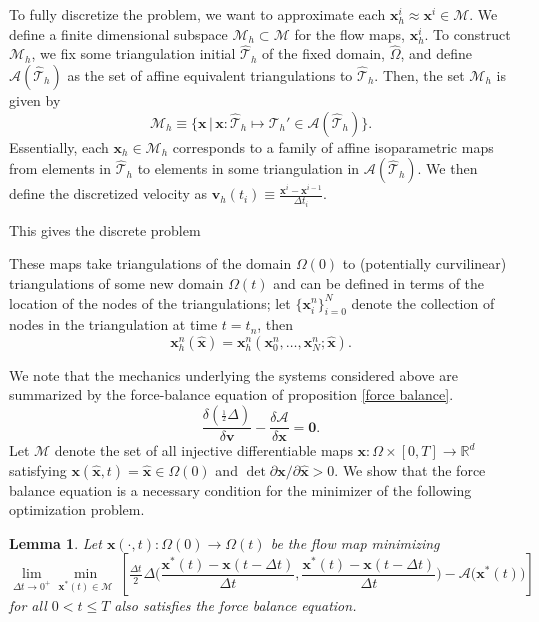 \documentclass[final,10pt]{article}
\newtheorem{lemma}{Lemma}
\begin{document}
To fully discretize the problem, we want to approximate each $\bm x^i_h \approx \bm x^i \in \mathcal M$.
We define a finite dimensional subspace $\mathcal{M}_h \subset \mathcal M$ for the flow maps, $\bm x_h^i$.
To construct $\mathcal M_h$, we fix some triangulation initial $\hat{\mathcal T}_h$ of the fixed domain, $\hat \Omega$,
and define $\mathcal A (\hat{\mathcal T}_h)$ as the set of affine equivalent triangulations to $\hat{\mathcal T}_h$.
Then, the set $\mathcal M_h$ is given by
\[
	\mathcal{M}_h \equiv \Big\{ \bm x \, \big| \, \bm x: \hat{\mathcal{T}}_h \mapsto \mathcal T_h' \in \mathcal A(\hat{\mathcal T}_h) \Big\}.
\]
Essentially, each $\bm x_h \in \mathcal M_h$ corresponds to a family of affine isoparametric maps from elements in $\hat{\mathcal T}_h$
to elements in some triangulation in $\mathcal A (\hat{\mathcal{T}}_h)$.
We then define the discretized velocity as $\bm v_h(t_i) \equiv \frac{\bm x^i - \bm x^{i-1}}{\Delta t_i}$.

This gives the discrete problem












These maps take triangulations of the domain $\Omega(0)$ to (potentially curvilinear) triangulations of some new domain $\Omega(t)$
and can be defined in terms of the location of the nodes of the triangulations;
let $\{ \bm x^n_i \}_{i=0}^N$ denote the collection of nodes in the triangulation at time $t=t_n$, then
\[
	\bm x^n_h(\hat{\bm x}) = \bm x^n_h( \bm x^n_0,\ldots,\bm x_N^n; \hat{\bm x}).
\]


We note that the mechanics underlying the systems considered above are summarized by the force-balance equation of proposition \ref{force balance}.
\[
	\frac{\delta (\frac{_1}{^2}\Delta)}{\delta \bm v}-\frac{\delta \mathcal{A}}{\delta \bm x}	= \bm 0.
\]
Let $\mathcal{M}$ denote the set of all injective differentiable maps $\bm x:\Omega\times[0,T]\rightarrow\mathbb{R}^d$ satisfying $\bm x(\hat{\bm x},t) = \hat{\bm x} \in \Omega(0)$
and $\det \partial \bm x/ \partial \hat{\bm x} > 0$.
We show that the force balance equation is a necessary condition for the minimizer of the following optimization problem.

\begin{lemma}
Let $\bm x(\cdot,t):\Omega(0)\rightarrow\Omega(t)$ be the flow map minimizing
\begin{equation}	\label{continuous minimization principle}
	\lim_{\Delta t \rightarrow 0^+} \min_{\bm x^*(t)\in \mathcal M}
					\ \left[ \frac{_{\Delta t}}{^2} \Delta\bigg(\frac{\bm x^*(t)-\bm x(t-\Delta t)}{\Delta t},\frac{\bm x^*(t)-\bm x(t-\Delta t)}{\Delta t}\bigg)
					- \mathcal{A}\big( \bm x^*(t) \big) \right]
\end{equation}
for all $0 < t \le T$ also satisfies the force balance equation.
\end{lemma}
\end{document}
